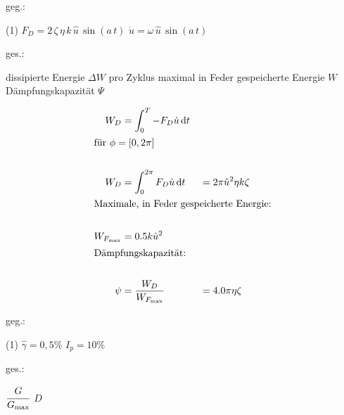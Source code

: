 \begin{questions}
    \vspace{1em}

        \begin{minipage}[t]{.49\linewidth}
        geg.:
            \begin{tasks} (1)
                \task[] $F_D = 2\, \zeta\, \eta\, k\, \hat u\, \sin(a\, t)$
                \task[] $\dot{u} = \omega\,\hat u\, \sin(a\,t)$
            \end{tasks}
        \end{minipage}
        \begin{minipage}[t]{.49\linewidth}
        ges.:
            \begin{tasks}
                \task[] dissipierte Energie $\Delta W$ pro Zyklus
                \task[] maximal in Feder gespeicherte Energie $W$
                \task[] Dämpfungskapazität $\Psi$
            \end{tasks}
        \end{minipage}
    \vspace{1cm}

    \begin{solution}
        \begin{align*}
            W_D &= \int_{0}^{T} -F_D \dot{u} \dd{t}\\
            \intertext{für $\phi = [0, 2\pi]$} \\
            W_D &= \int_{0}^{2 \pi} F_D \dot{u} \dd{t} &&= 2 \pi \hat{u}^2 \eta k \zeta\\
            \intertext{Maximale, in Feder gespeicherte Energie:} \\
            W_{F_{\max}} &= 0.5 k \hat{u}^2 \\
            \intertext{Dämpfungskapazität:} \\
            \psi &= \frac{W_D}{W_{F_{\max}}} &&= 4.0 \pi \eta \zeta \\
        \end{align*}

    \end{solution}


    \vspace{1em}

    \begin{minipage}[t]{.49\linewidth}
    geg.:
        \begin{tasks} (1)
            \task[] $\hat\gamma = 0,5\%$
            \task[] $I_p = 10 \%$
        \end{tasks}
    \end{minipage}
    \begin{minipage}[t]{.49\linewidth}
    ges.:
        \begin{tasks}
            \task[] $\cfrac{G}{G_{\max}}$
            \task[] $D$
        \end{tasks}
    \end{minipage}


\end{questions}
